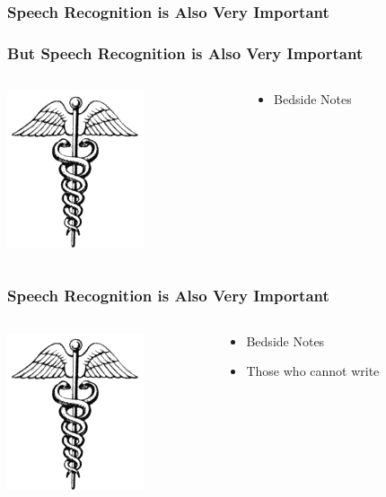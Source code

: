 \documentclass[pdflatex,compress]{beamer}
\begin{document}


\begin{frame}
  \frametitle{Speech Recognition is Also Very Important}
\end{frame}

\begin{frame}
  \frametitle{But Speech Recognition is Also Very Important}
  \begin{columns}[onlytextwidth]
    \begin{column}{0.6\textwidth}
      \centering
      \includegraphics[scale=1.5]{caduceus.png}\\
    \end{column}
    \begin{column}{0.4\textwidth}
      \begin{itemize}
      \item Bedside Notes
      \end{itemize}
    \end{column}
​    \end{columns}
\end{frame}

\begin{frame}
  \frametitle{Speech Recognition is Also Very Important}
  \begin{columns}[onlytextwidth]
    \begin{column}{0.6\textwidth}
      \centering
      \includegraphics[scale=1.5]{caduceus.png}\\
    \end{column}
    \begin{column}{0.4\textwidth}
      \begin{itemize}
      \item Bedside Notes
      \item Those who cannot write
      \end{itemize}
    \end{column}
​    \end{columns}
\end{frame}
\end{document}
